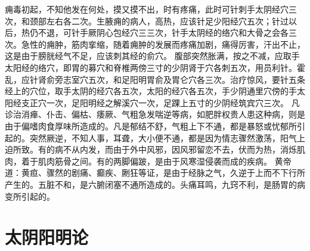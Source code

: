 \documentclass[a4paper,12pt,UTF8,twoside]{ctexbook}
\begin{document}
痈毒初起，不知他发在何处，摸又摸不出，时有疼痛，此时可针刺手太阴经穴三次，和颈部左右各二次。生腋痈的病人，高热，应该针足少阳经穴五次；针过以后，热仍不退，可针手厥阴心包经穴三三次，针手太阴经的络穴和大骨之会各三次。急性的痈肿，筋肉挛缩，随着痈肿的发展而疼痛加剧，痛得厉害，汗出不止，这是由于膀胱经气不足，应该刺其经的俞穴。
腹部突然胀满，按之不减，应取手太阳经的络穴，即胃的募穴和脊椎两傍三寸的少阴肾于穴各刺五次，用员利针。霍乱，应针肾俞旁志室穴五次，和足阳明胃俞及胃仑穴各三次。治疗惊风，要针五条经上的穴位，取手太阴的经穴各五次，太阳的经穴各五次，手少阴通里穴傍的手太阳经支正穴一次，足阳明经之解溪穴一次，足踝上五寸的少阴经筑宾穴三次。
凡诊治消瘅、仆击、偏枯、痿厥、气粗急发喘逆等病，如肥胖权贵人患这种病，则是由于偏嗜肉食厚味所造成的。凡是郁结不舒，气粗上下不通，都是暴怒或忧郁所引起的。突然厥逆，不知人事，耳聋，大小便不通，都是因为情志骤然激荡，阳气上迫所致。有的病不从内发，而由于外中风邪，因风邪留恋不去，伏而为热，消烁肌肉，着于肌肉筋骨之间。有的两脚偏跛，是由于风寒湿侵袭而成的疾病。
黄帝道：黄疸、骤然的剧痛、癫疾、劂狂等证，是由于经脉之气，久逆于上而不下行所产生的。五脏不和，是六腑闭塞不通所造成的。头痛耳鸣，九窍不利，是肠胃的病变所引起的。

\chapter{太阴阳明论}
\end{document}

